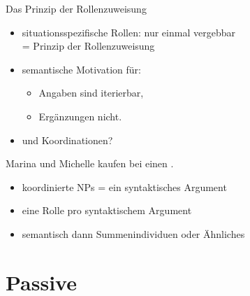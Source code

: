 \begin{frame}
  {Das Prinzip der Rollenzuweisung}
  \onslide<+-> 
  \begin{itemize}[<+->]
    \item situationsspezifische Rollen: \alert{nur einmal vergebbar}\\
    = Prinzip der Rollenzuweisung
      \Halbzeile
    \item semantische Motivation für:
      \begin{itemize}[<+->]
        \item Angaben sind iterierbar,
        \item Ergänzungen nicht.
      \end{itemize}
      \Halbzeile
    \item und \alert{Koordinationen}?
  \end{itemize}
  \onslide<+->
  \begin{exe}
    \ex \alert{Marina und Michelle} kaufen bei  einen .
  \end{exe}
  \begin{itemize}[<+->]
    \item koordinierte NPs = \alert{ein} syntaktisches Argument
    \item eine Rolle pro syntaktischem Argument
    \item semantisch dann Summenindividuen oder Ähnliches
  \end{itemize}
\end{frame}

\section{Passive}

